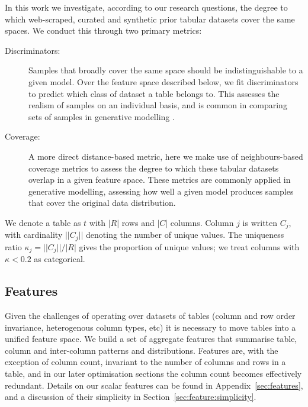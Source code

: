 \documentclass{article}
\begin{document}
In this work we investigate, according to our research questions, the degree to which web-scraped, curated and synthetic prior tabular datasets cover the same spaces.
We conduct this through two primary metrics:
\begin{description}
    \item[Discriminators:] Samples that broadly cover the same space should be indistinguishable to a given model. Over the feature space described below, we fit discriminators to predict which class of dataset a table belongs to. This assesses the realism of samples on an individual basis, and is common in comparing sets of samples in generative modelling \cite{borjiProsConsGAN2019, goodfellowGenerativeAdversarialNets2014}.
    \item[Coverage:] A more direct distance-based metric, here we make use of neighbours-based coverage metrics \cite{kynkaanniemiImprovedPrecisionRecall2019, naeemReliableFidelityDiversity2020, sajjadiAssessingGenerativeModels2018} to assess the degree to which these tabular datasets overlap in a given feature space. These metrics are commonly applied in generative modelling, assessing how well a given model produces samples that cover the original data distribution.
\end{description}

We denote a table as $t$ with $|R|$ rows and $|C|$ columns. Column $j$ is written $C_j$, with cardinality $||C_j||$ denoting the number of unique values. The uniqueness ratio $\kappa_j = ||C_j||/|R|$ gives the proportion of unique values; we treat columns with $\kappa < 0.2$ as categorical. 

\subsection{Features}

Given the challenges of operating over datasets of tables (column and row order invariance, heterogenous column types, etc) it is necessary to move tables into a unified feature space.
We build a set of aggregate features that summarise table, column and inter-column patterns and distributions.
Features are, with the exception of column count, invariant to the number of columns and rows in a table, and in our later optimisation sections the column count becomes effectively redundant.
Details on our scalar features can be found in Appendix~\ref{sec:features}, and a discussion of their simplicity in Section~\ref{sec:feature:simplicity}.
\end{document}
